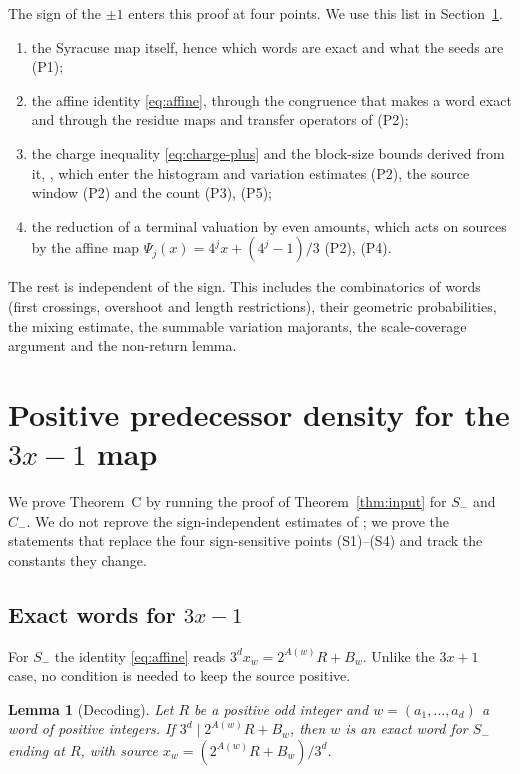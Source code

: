 \documentclass[11pt]{amsart}
\newtheorem{lemma}[theorem]{Lemma}
\theoremstyle{definition}
\theoremstyle{remark}
\newcommand{\Cm}{C_{-}}
\newcommand{\Sm}{S_{-}}
\begin{document}
The sign of the $\pm1$ enters this proof at four points. We use this list in
Section~\ref{sec:minus}.
\begin{enumerate}[leftmargin=*,label=(S\arabic*)]
\item the Syracuse map itself, hence which words are exact and what the seeds are (P1);
\item the affine identity \eqref{eq:affine}, through the congruence that makes a word exact and
  through the residue maps and transfer operators of \cite[\S2]{MazurM1} (P2);
\item the charge inequality \eqref{eq:charge-plus} and the block-size bounds derived from it,
  \cite[(3.5)]{MazurM1}, which enter the histogram and variation estimates (P2), the source
  window (P2) and the count (P3), (P5);
\item the reduction of a terminal valuation by even amounts, which acts on sources by the affine
  map $\Psi_j(x)=4^jx+(4^j-1)/3$ (P2), (P4).
\end{enumerate}
The rest is independent of the sign. This includes the combinatorics of words (first crossings,
overshoot and length restrictions), their geometric probabilities, the mixing estimate, the
summable variation majorants, the scale-coverage argument and the non-return lemma.

\section{Positive predecessor density for the \texorpdfstring{$3x-1$}{3x-1} map}\label{sec:minus}

We prove Theorem~C by running the proof of Theorem~\ref{thm:input} for $\Sm$ and $\Cm$. We do not reprove the
sign-independent estimates of \cite{MazurM1,MazurM2}; we prove the statements that replace the
four sign-sensitive points (S1)--(S4) and track the constants they change.

\subsection{Exact words for \texorpdfstring{$3x-1$}{3x-1}}
For $\Sm$ the identity \eqref{eq:affine} reads $3^{d}x_w=2^{A(w)}R+B_w$. Unlike the $3x+1$ case,
no condition is needed to keep the source positive.

\begin{lemma}[Decoding]\label{lem:decode}
Let $R$ be a positive odd integer and $w=(a_1,\dots,a_d)$ a word of positive integers. If
$3^{d}\mid 2^{A(w)}R+B_w$, then $w$ is an exact word for $\Sm$ ending at $R$, with source
$x_w=(2^{A(w)}R+B_w)/3^{d}$.
\end{lemma}
\end{document}
